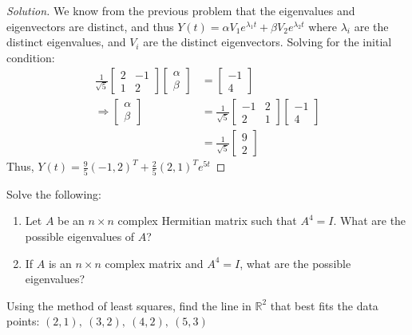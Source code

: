 \documentclass[../main.tex]{subfiles}
\begin{document}
\begin{proof}[Solution]
We know from the previous problem that the eigenvalues and eigenvectors are distinct, and thus $Y(t) = \alpha V_1 e^{\lambda_1 t} + \beta V_2 e^{\lambda_2 t}$ where $\lambda_{i}$ are the distinct eigenvalues, and $V_{i}$ are the distinct eigenvectors. Solving for the initial condition:
%
\begin{align*}
    \frac{1}{\sqrt{5}}\begin{bmatrix} 2 & -1 \\ 1 & 2 \end{bmatrix}  \begin{bmatrix} \alpha \\ \beta \end{bmatrix} &= \begin{bmatrix} -1 \\ 4 \end{bmatrix}\\    
    \Rightarrow \begin{bmatrix} \alpha \\ \beta \end{bmatrix} &= \frac{1}{\sqrt{5}}\begin{bmatrix} -1 & 2 \\ 2 & 1 \end{bmatrix} \begin{bmatrix} -1 \\ 4 \end{bmatrix}\\
    &= \frac{1}{\sqrt{5}} \begin{bmatrix} 9 \\ 2 \end{bmatrix}
\end{align*}
Thus, $Y(t) = \frac{9}{5}(-1,2)^T + \frac{2}{5} (2,1)^T e^{5t}$ 
\end{proof}
%
\begin{problem}
Solve the following:
\begin{enumerate}
\item Let $A$ be an $n\times n$ complex Hermitian matrix such that $A^4=I$. What are the possible eigenvalues of $A$?
\item If $A$ is an $n\times n$ complex matrix and $A^4 = I$, what are the possible eigenvalues?
\end{enumerate}
\end{problem}
%
\begin{problem}
Using the method of least squares, find the line in $\mathbb{R}^2$ that best fits the data points: $(2,1),\ (3,2),\ (4,2),\ (5,3)$
\end{problem}
\end{document}
